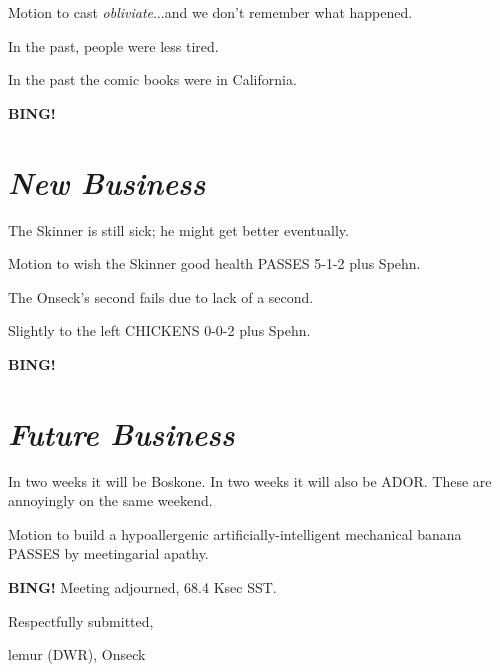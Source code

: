 \documentclass[10pt]{article}
\newcommand{\bing}{{\bf BING!} }
\newcommand{\goto}[1]{\bing \vskip 12pt \section*{{\em{#1}}}}
\newcommand{\ps}{ plus Spehn\xspace}
\newcommand{\onseck}{lemur (DWR), Onseck}
\begin{document}
Motion to cast \emph{obliviate}...and we don't remember what happened.

In the past, people were less tired.

In the past the comic books were in California.

\goto{New Business}

The Skinner is still sick; he might get better eventually.

Motion to wish the Skinner good health PASSES 5-1-2\ps.

The Onseck's second fails due to lack of a second.

Slightly to the left CHICKENS 0-0-2\ps.

\goto{Future Business}

In two weeks it will be Boskone.  In two weeks it will also be
ADOR.  These are annoyingly on the same weekend.

Motion to build a hypoallergenic artificially-intelligent mechanical banana
PASSES by meetingarial apathy.

\bing
\noindent
Meeting adjourned, 68.4 Ksec SST.

\vspace{18pt}

\centerline{Respectfully submitted,}
\centerline{\onseck}
\end{document}
